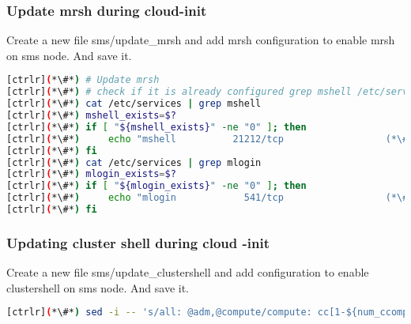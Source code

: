\subsubsection{Update mrsh during cloud-init}
 
Create a new file sms/update\_mrsh and add mrsh configuration to enable mrsh on sms node. And save it. 


\begin{lstlisting}[language=bash,keywords={}]
[ctrlr](*\#*) # Update mrsh
[ctrlr](*\#*) # check if it is already configured grep mshell /etc/services will return non-zero, else configure"
[ctrlr](*\#*) cat /etc/services | grep mshell
[ctrlr](*\#*) mshell_exists=$?
[ctrlr](*\#*) if [ "${mshell_exists}" -ne "0" ]; then
[ctrlr](*\#*)     echo "mshell          21212/tcp                  (*\#*) mrshd" >> /etc/services
[ctrlr](*\#*) fi
[ctrlr](*\#*) cat /etc/services | grep mlogin
[ctrlr](*\#*) mlogin_exists=$?
[ctrlr](*\#*) if [ "${mlogin_exists}" -ne "0" ]; then
[ctrlr](*\#*)     echo "mlogin            541/tcp                  (*\#*) mrlogind" >> /etc/services
[ctrlr](*\#*) fi
\end{lstlisting} 


\subsubsection{Updating cluster shell during cloud -init}
Create a new file sms/update\_clustershell and add configuration to enable clustershell on sms node. And save it. 



\begin{lstlisting}[language=bash,keywords={}]
[ctrlr](*\#*) sed -i -- 's/all: @adm,@compute/compute: cc[1-${num_ccomputes}]\n&/' /etc/clustershell/groups.d/local.cfg
\end{lstlisting} 
